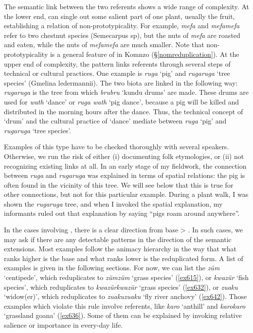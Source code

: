 The semantic link between the two referents shows a wide range of complexity. At the lower end,  can single out some salient part of one plant, usually the fruit, establishing a relation of non-prototypicality. For example, \emph{mefa} and \emph{mefamefa} refer to two chestnut species (Semecarpus sp), but the nuts of \emph{mefa} are roasted and eaten, while the nuts of \emph{mefamefa} are much smaller. Note that non-prototypicality is a general feature of  in Komnzo ({\S}\ref{nomreduplication}). At the upper end of complexity, the  pattern links referents through several steps of technical or cultural practices. One example is \emph{ruga} `pig' and \emph{rugaruga} `tree species' (Gmelina ledermannii). The two biota are linked in the following way: \emph{rugaruga} is the tree from which \emph{brubru} `kundu drums' are made. These drums are used for \emph{wath} `dance' or \emph{ruga wath} `pig dance', because a pig will be killed and distributed in the morning hours after the dance. Thus, the technical concept of `drum' and the cultural practice of `dance' mediate between \emph{ruga} `pig' and \emph{rugaruga} `tree species'.

Examples of this type have to be checked thoroughly with several speakers. Otherwise, we run the risk of either (i) documenting folk etymologies, or (ii) not recognizing existing links at all. In an early stage of my fieldwork, the connection between \emph{ruga} and \emph{rugaruga} was explained in terms of spatial relations: the pig is often found in the vicinity of this tree. We will see below that this is true for other connections, but not for this particular example. During a plant walk, I was shown the \emph{rugaruga} tree, and when I invoked the spatial explanation, my informants ruled out that explanation by saying ``pigs roam around anywhere''.

In the cases involving , there is a clear direction from base > . In such cases, we may ask if there are any detectable patterns in the direction of the semantic extensions. Most examples follow the animacy hierarchy in the way that what ranks higher is the base and what ranks lower is the reduplicated form. A list of examples is given in the following sections. For now, we can list the \emph{züm} `centipede', which reduplicates to \emph{zümzüm} `grass species' (\ref{ex615}), or \emph{kwazür} `fish species', which reduplicates to \emph{kwazürkwazür} `grass species' (\ref{ex632}), or \emph{zuaku} `widow(er)', which reduplicates to \emph{zuakuzuaku} `fly river anchovy' (\ref{ex642}). Those examples which violate this rule involve  referents, like \emph{karo} `anthill' and \emph{karokaro} `grassland goana' (\ref{ex636}). Some of them can be explained by invoking relative salience or importance in every-day life.

